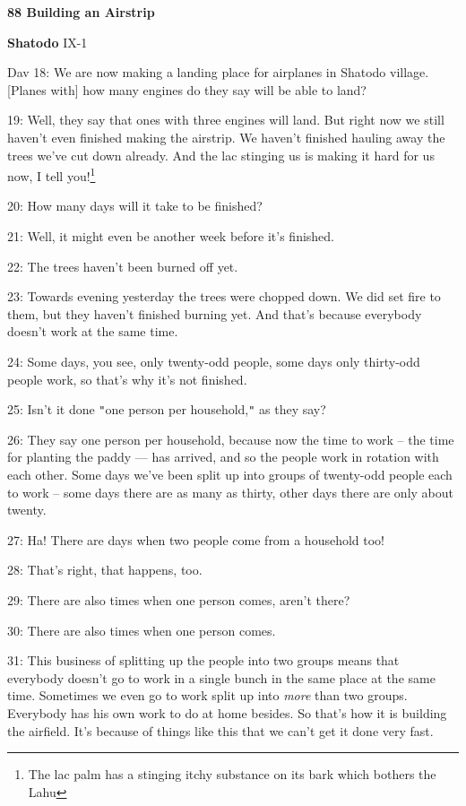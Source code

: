 
\textbf{88 Building an Airstrip }

\textbf{Shatodo} IX-1

Dav 18: We are now making a landing place for airplanes in Shatodo village. [Planes
with] how many engines do they say will be able to land?

19: Well, they say that ones with three engines will land. But right now we still
haven't even finished making the airstrip. We haven't finished hauling away the
trees we've cut down already. And the lac stinging us is making it hard for us
now, I tell you!\footnote{The lac palm has a stinging itchy substance on its bark which bothers the Lahu}

20: How many days will it take to be finished?

21: Well, it might even be another week before it's finished.

22: The trees haven't been burned off yet.

23: Towards evening yesterday the trees were chopped down. We did set fire to them,
but they haven't finished burning yet. And that's because everybody doesn't work
at the same time.

24: Some days, you see, only twenty-odd people, some days only thirty-odd people
work, so that's why it's not finished.

25: Isn't it done \texttt{"}one person per household,\texttt{"} as they say?

26: They say one person per household, because now the time to work -- the time
for planting the paddy --- has arrived, and so the people work in rotation with
each other. Some days we've been split up into groups of twenty-odd people each
to work -- some days there are as many as thirty, other days there are only about
twenty.

27: Ha! There are days when two people come from a household too!

28: That's right, that happens, too.

29: There are also times when one person comes, aren't there?

30: There are also times when one person comes.

31: This business of splitting up the people into two groups means that everybody
doesn't go to work in a single bunch in the same place at the same time. Sometimes
we even go to work split up into \textit{more} than two groups. Everybody has his
own work to do at home besides. So that's how it is building the airfield. It's
because of things like this that we can't get it done very fast.

